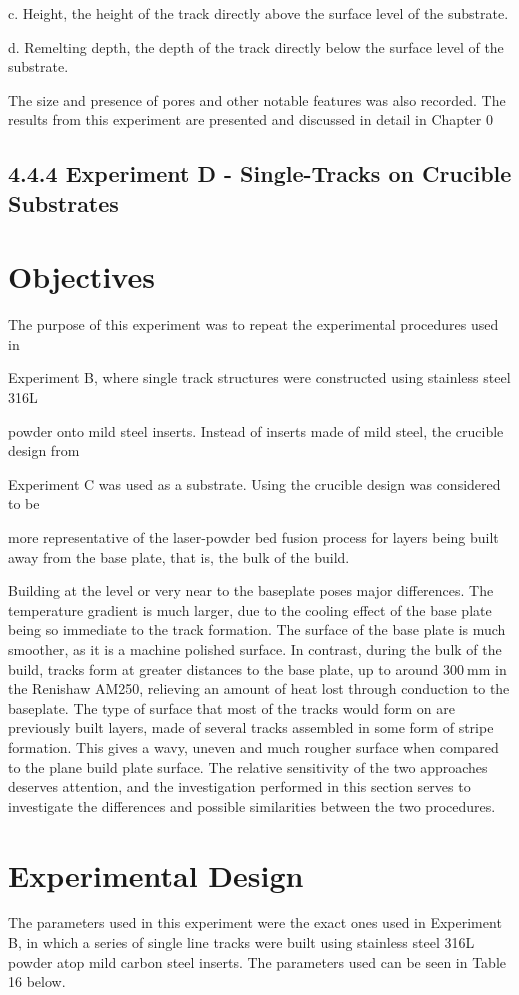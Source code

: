 \documentclass[10pt]{article}
\begin{document}
c. Height, the height of the track directly above the surface level of the substrate.

d. Remelting depth, the depth of the track directly below the surface level of the substrate.

The size and presence of pores and other notable features was also recorded. The results from this experiment are presented and discussed in detail in Chapter 0

\subsection*{4.4.4 Experiment D - Single-Tracks on Crucible Substrates}
\section*{Objectives}
The purpose of this experiment was to repeat the experimental procedures used in

Experiment B, where single track structures were constructed using stainless steel 316L

powder onto mild steel inserts. Instead of inserts made of mild steel, the crucible design from

Experiment $\mathrm{C}$ was used as a substrate. Using the crucible design was considered to be

more representative of the laser-powder bed fusion process for layers being built away from the base plate, that is, the bulk of the build.

Building at the level or very near to the baseplate poses major differences. The temperature gradient is much larger, due to the cooling effect of the base plate being so immediate to the track formation. The surface of the base plate is much smoother, as it is a machine polished surface. In contrast, during the bulk of the build, tracks form at greater distances to the base plate, up to around $300 \mathrm{~mm}$ in the Renishaw AM250, relieving an amount of heat lost through conduction to the baseplate. The type of surface that most of the tracks would form on are previously built layers, made of several tracks assembled in some form of stripe formation. This gives a wavy, uneven and much rougher surface when compared to the plane build plate surface. The relative sensitivity of the two approaches deserves attention, and the investigation performed in this section serves to investigate the differences and possible similarities between the two procedures.

\section*{Experimental Design}
The parameters used in this experiment were the exact ones used in Experiment B, in which a series of single line tracks were built using stainless steel 316L powder atop mild carbon steel inserts. The parameters used can be seen in Table 16 below.
\end{document}
